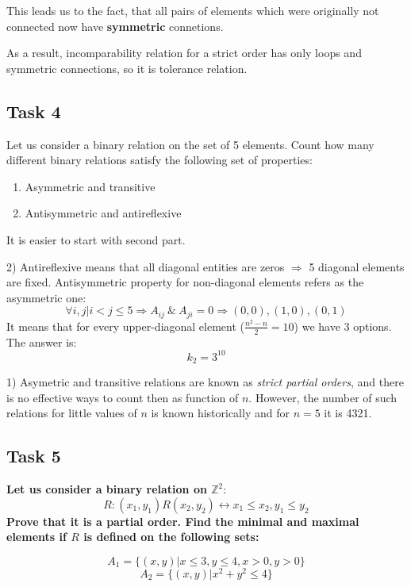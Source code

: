 This leads us to the fact, that all pairs of elements which were originally not connected now have \textbf{symmetric} connetions.

As a result, incomparability relation for a strict order has only loops and symmetric connections, so it is tolerance relation.
\subsection{Task 4}

Let us consider a binary relation on the set of 5 elements. Count how many different
binary relations satisfy the following set of properties:

\begin{enumerate}
\item Asymmetric and transitive
\item Antisymmetric and antireflexive
\end{enumerate}

It is easier to start with second part.

2) Antireflexive means that all diagonal entities are zeros $\Rightarrow$ 5 diagonal elements are fixed.
Antisymmetric property for non-diagonal elements refers as the asymmetric one:
\[  \forall i,j | i < j \leq 5 \Rightarrow A_{ij}\ \& \ A_{ji} = 0 \Rightarrow (0,0), (1,0), (0,1)  \]
It means that for every upper-diagonal element ($\frac{n^2-n}{2}=10$)  we have 3 options.
The answer is:
\[ k_2=3^{10} \]

1) Asymetric and transitive relations are known as \textit{strict partial orders}, and there is no effective ways to count then as function of $n$.
However, the number of such relations for little values of $n$ is known historically and for $n=5$ it is 4321.

\subsection{Task 5}

\begin{center}
\textbf{Let us consider a binary relation on $\mathbb{Z}^2$}:
\[ R : (x_1, y_1)R(x_2, y_2) \leftrightarrow x_1 \leq x_2, y_1 \leq y_2 \]
\textbf{Prove that it is a partial order.
Find the minimal and maximal elements if $R$ is defined on the following sets:}

\[ A_1 = \{ (x,y) | x \leq 3, y \leq 4, x > 0, y > 0 \} \]
\[ A_2 = \{ (x,y) | x^2 + y^2 \leq 4 \} \]
\end{center}

